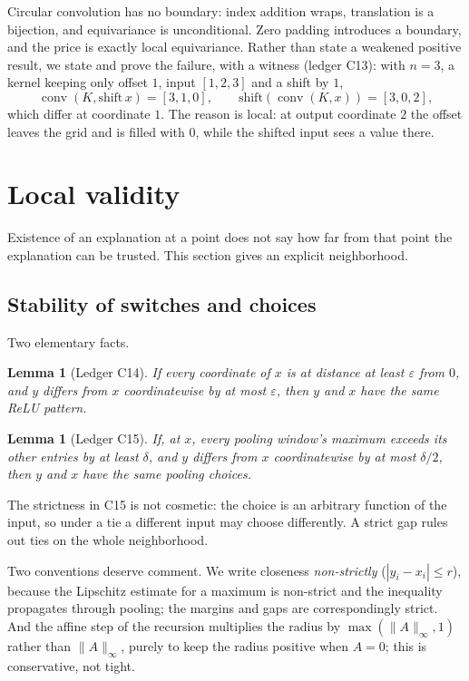 \documentclass[11pt]{article}
\newtheorem{lemma}[theorem]{Lemma}
\begin{document}
Circular convolution has no boundary: index addition wraps, translation is a
bijection, and equivariance is unconditional. Zero padding introduces a
boundary, and the price is exactly local equivariance. Rather than state a
weakened positive result, we state and prove the failure, with a witness
(ledger C13): with $n = 3$, a kernel keeping only offset $1$, input
$[1,2,3]$ and a shift by $1$,
\[
  \operatorname{conv}(K, \text{shift}\,x) = [3,1,0], \qquad
  \text{shift}(\operatorname{conv}(K,x)) = [3,0,2],
\]
which differ at coordinate $1$. The reason is local: at output coordinate $2$
the offset leaves the grid and is filled with $0$, while the shifted input sees
a value there.

\section{Local validity}\label{sec:radius}

Existence of an explanation at a point does not say how far from that point the
explanation can be trusted. This section gives an explicit neighborhood.

\subsection{Stability of switches and choices}

Two elementary facts.

\begin{lemma}[Ledger C14]
If every coordinate of $x$ is at distance at least $\varepsilon$ from $0$, and
$y$ differs from $x$ coordinatewise by at most $\varepsilon$, then $y$ and $x$
have the same ReLU pattern.
\end{lemma}

\begin{lemma}[Ledger C15]
If, at $x$, every pooling window's maximum exceeds its other entries by at
least $\delta$, and $y$ differs from $x$ coordinatewise by at most
$\delta/2$, then $y$ and $x$ have the same pooling choices.
\end{lemma}

The strictness in C15 is not cosmetic: the choice is an arbitrary function of
the input, so under a tie a different input may choose differently. A strict
gap rules out ties on the whole neighborhood.

Two conventions deserve comment. We write closeness \emph{non-strictly}
($|y_i - x_i| \le r$), because the Lipschitz estimate for a maximum is
non-strict and the inequality propagates through pooling; the margins and gaps
are correspondingly strict. And the affine step of the recursion multiplies the
radius by $\max(\|A\|_\infty, 1)$ rather than $\|A\|_\infty$, purely to keep
the radius positive when $A = 0$; this is conservative, not tight.
\end{document}
